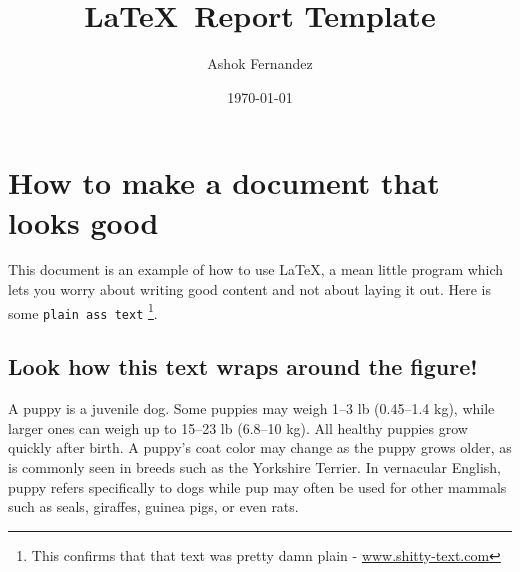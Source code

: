 \documentclass[a4paper, 12pt, notitlepage]{report}
\begin{document}
\title{\LaTeX\ Report Template} 
\author{Ashok Fernandez} 
\date{\today} 

\maketitle

\tableofcontents 

\setlength{\parskip}{0.8em}







\chapter{How to make a document that looks good}
This document is an example of how to use \LaTeX, a mean little program which lets you worry about writing good content and not about laying it out. Here is some \texttt{plain ass text} \footnote{This confirms that that text was pretty damn plain - \url{www.shitty-text.com}}. 

\section{Look how this text wraps around the figure!}
A puppy is a juvenile dog. Some puppies may weigh 1–3 lb (0.45–1.4 kg), while larger ones can weigh up to 15–23 lb (6.8–10 kg). All healthy puppies grow quickly after birth. A puppy's coat color may change as the puppy grows older, as is commonly seen in breeds such as the Yorkshire Terrier. In vernacular English, puppy refers specifically to dogs while pup may often be used for other mammals such as seals, giraffes, guinea pigs, or even rats.
\end{document}
